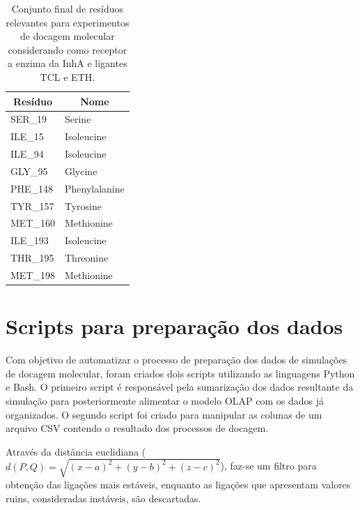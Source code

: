 \begin{table}[h]
\caption{Conjunto final de resíduos relevantes para experimentos de docagem molecular considerando como receptor a enzima da InhA e ligantes TCL e ETH.}
\label{tab:listaProvavelRelevantes}
\centering
\begin{tabular}{@{}ll@{}}
\toprule
\multicolumn{1}{c}{Resíduo} & \multicolumn{1}{c}{Nome} \\ \midrule
SER\_19                     & Serine                   \\
ILE\_15                     & Isoleucine               \\
ILE\_94                     & Isoleucine               \\
GLY\_95                     & Glycine                  \\
PHE\_148                    & Phenylalanine            \\
TYR\_157                    & Tyrosine                 \\
MET\_160                    & Methionine               \\
ILE\_193                    & Isoleucine               \\
THR\_195                    & Threonine                \\
MET\_198                    & Methionine               \\ \bottomrule
\end{tabular}
\end{table}

\section{Scripts para preparação dos dados}
\label{sec:ScriptsParaPreparacaoDosDados}

Com objetivo de automatizar o processo de preparação dos dados de simulações de docagem molecular, foram criados dois scripts utilizando as linguagens Python e Bash. O primeiro script é responsável pela sumarização dos dados resultante da simulação para posteriormente alimentar o modelo OLAP com os dados já organizados. O segundo script foi criado para manipular as colunas de um arquivo CSV contendo o resultado dos processos de docagem.

Através da distância euclidiana ($d(P, Q)= \sqrt{(x - a)^{2} +(y - b)^{2} + (z - c)^{2}}$), faz-se um filtro para obtenção das ligações mais estáveis, enquanto as ligações que apresentam valores ruins, consideradas instáveis, são descartadas.

